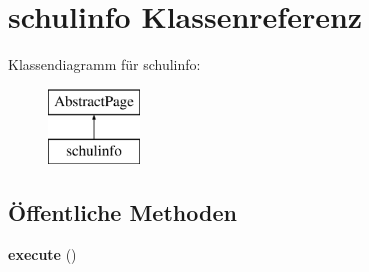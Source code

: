 \hypertarget{classschulinfo}{}\section{schulinfo Klassenreferenz}
\label{classschulinfo}
Klassendiagramm für schulinfo\+:\begin{figure}[H]
\begin{center}
\leavevmode
\includegraphics[height=2.000000cm]{classschulinfo}
\end{center}
\end{figure}
\subsection*{Öffentliche Methoden}
\begin{DoxyCompactItemize}
\item 
\mbox{\label{classschulinfo_ae268bd05c6e4628323f4bb5c9fd88722}} 
{\bfseries execute} ()
\end{DoxyCompactItemize}

